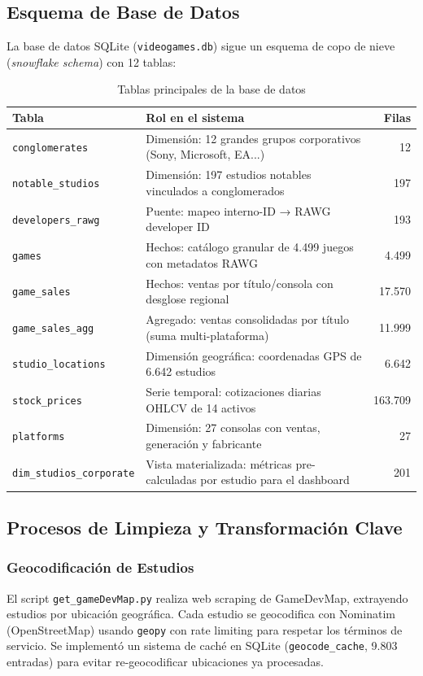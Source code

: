 \documentclass[11pt,a4paper]{article}
\begin{document}
\subsection{Esquema de Base de Datos}

La base de datos SQLite (\texttt{videogames.db}) sigue un esquema de copo de nieve (\textit{snowflake schema}) con 12 tablas:

\begin{table}[H]
\centering
\caption{Tablas principales de la base de datos}
\label{tab:schema}
\begin{tabularx}{\textwidth}{l X r}
\toprule
Tabla & Rol en el sistema & Filas \\
\midrule
\texttt{conglomerates} & Dimensión: 12 grandes grupos corporativos (Sony, Microsoft, EA...) & 12 \\
\texttt{notable\_studios} & Dimensión: 197 estudios notables vinculados a conglomerados & 197 \\
\texttt{developers\_rawg} & Puente: mapeo interno-ID → RAWG developer ID & 193 \\
\texttt{games} & Hechos: catálogo granular de 4.499 juegos con metadatos RAWG & 4.499 \\
\texttt{game\_sales} & Hechos: ventas por título/consola con desglose regional & 17.570 \\
\texttt{game\_sales\_agg} & Agregado: ventas consolidadas por título (suma multi-plataforma) & 11.999 \\
\texttt{studio\_locations} & Dimensión geográfica: coordenadas GPS de 6.642 estudios & 6.642 \\
\texttt{stock\_prices} & Serie temporal: cotizaciones diarias OHLCV de 14 activos & 163.709 \\
\texttt{platforms} & Dimensión: 27 consolas con ventas, generación y fabricante & 27 \\
\texttt{dim\_studios\_corporate} & Vista materializada: métricas pre-calculadas por estudio para el dashboard & 201 \\
\bottomrule
\end{tabularx}
\end{table}

\subsection{Procesos de Limpieza y Transformación Clave}

\subsubsection{Geocodificación de Estudios}
El script \texttt{get\_gameDevMap.py} realiza web scraping de GameDevMap, extrayendo estudios por ubicación geográfica. Cada estudio se geocodifica con Nominatim (OpenStreetMap) usando \texttt{geopy} con rate limiting para respetar los términos de servicio. Se implementó un sistema de caché en SQLite (\texttt{geocode\_cache}, 9.803 entradas) para evitar re-geocodificar ubicaciones ya procesadas.
\end{document}
